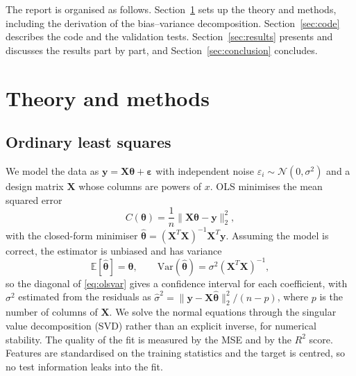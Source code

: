 \documentclass[a4paper,11pt]{article}
\newcommand{\by}{\boldsymbol{y}}
\newcommand{\bX}{\boldsymbol{X}}
\newcommand{\bth}{\boldsymbol{\theta}}
\newcommand{\beps}{\boldsymbol{\varepsilon}}
\begin{document}
The report is organised as follows. Section~\ref{sec:theory} sets up the theory
and methods, including the derivation of the bias--variance decomposition.
Section~\ref{sec:code} describes the code and the validation tests.
Section~\ref{sec:results} presents and discusses the results part by part, and
Section~\ref{sec:conclusion} concludes.

\section{Theory and methods}
\label{sec:theory}

\subsection{Ordinary least squares}
We model the data as $\by=\bX\bth+\beps$ with independent noise
$\varepsilon_i\sim\mathcal{N}(0,\sigma^2)$ and a design matrix $\bX$ whose
columns are powers of $x$. OLS minimises the mean squared error
\begin{equation}
C(\bth)=\frac{1}{n}\lVert\bX\bth-\by\rVert_2^2,
\end{equation}
with the closed-form minimiser $\hat{\bth}=(\bX^T\bX)^{-1}\bX^T\by$. Assuming the
model is correct, the estimator is unbiased and has variance
\begin{equation}
\mathbb{E}[\hat{\bth}]=\bth,\qquad
\mathrm{Var}(\hat{\bth})=\sigma^2(\bX^T\bX)^{-1},
\label{eq:olsvar}
\end{equation}
so the diagonal of \eqref{eq:olsvar} gives a confidence interval for each
coefficient, with $\sigma^2$ estimated from the residuals as
$\hat{\sigma}^2=\lVert\by-\bX\hat{\bth}\rVert_2^2/(n-p)$, where $p$ is the
number of columns of $\bX$. We solve the normal
equations through the singular value decomposition (SVD) rather than an explicit
inverse, for numerical stability. The quality of the fit is measured by the MSE
and by the $R^2$ score. Features are standardised on the training statistics and
the target is centred, so no test information leaks into the fit.
\end{document}
